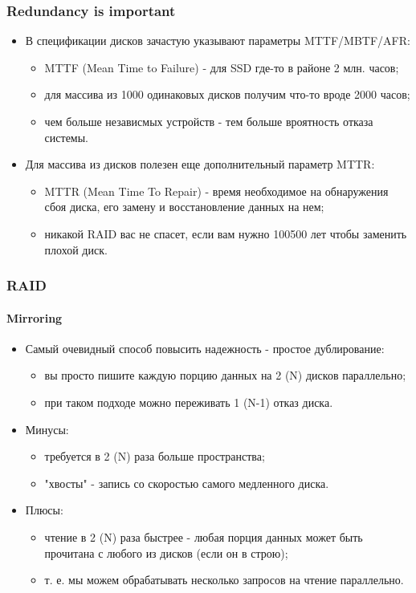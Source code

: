 \begin{frame}
\frametitle{Redundancy is important}
\begin{itemize}
  \item В спецификации дисков зачастую указывают параметры MTTF/MBTF/AFR:
  \begin{itemize}
    \item MTTF (Mean Time to Failure) - для SSD где-то в районе 2 млн. часов;
    \item для массива из 1000 одинаковых дисков получим что-то вроде 2000
    часов;
    \item чем больше независмых устройств - тем больше вроятность отказа
    системы.
  \end{itemize}
  \item Для массива из дисков полезен еще дополнительный параметр MTTR:
  \begin{itemize}
    \item MTTR (Mean Time To Repair) - время необходимое на обнаружения сбоя
    диска, его замену и восстановление данных на нем;
    \item никакой RAID вас не спасет, если вам нужно 100500 лет чтобы заменить
    плохой диск.
  \end{itemize}
\end{itemize}
\end{frame}

\begin{frame}
\frametitle{RAID}
\framesubtitle{Mirroring}
\begin{itemize}
  \item Самый очевидный способ повысить надежность - простое дублирование:
  \begin{itemize}
    \item вы просто пишите каждую порцию данных на 2 (N) дисков параллельно;
    \item при таком подходе можно переживать 1 (N-1) отказ диска.
  \end{itemize}
  \item Минусы:
  \begin{itemize}
    \item требуется в 2 (N) раза больше пространства;
    \item "хвосты" - запись со скоростью самого медленного диска.
  \end{itemize}
  \item Плюсы:
  \begin{itemize}
    \item чтение в 2 (N) раза быстрее - любая порция данных может быть прочитана
    с любого из дисков (если он в строю);
    \item т. е. мы можем обрабатывать несколько запросов на чтение параллельно.
  \end{itemize}
\end{itemize}
\end{frame}

